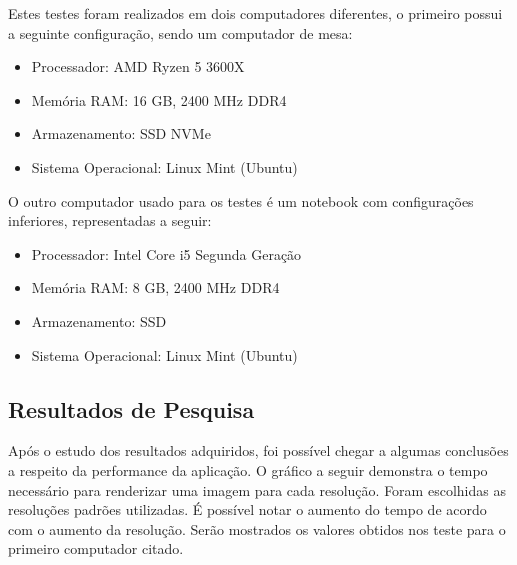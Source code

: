 \documentclass[journal]{IEEEtran}
\begin{document}
Estes testes foram realizados em dois computadores diferentes, o primeiro possui a seguinte configuração, sendo
um computador de mesa:

\begin{itemize}
  \item Processador: AMD Ryzen 5 3600X
  \item Memória RAM: 16 GB, 2400 MHz DDR4
  \item Armazenamento: SSD NVMe
  \item Sistema Operacional: Linux Mint (Ubuntu)
\end{itemize}

O outro computador usado para os testes é um notebook com configurações inferiores, representadas a seguir:

\begin{itemize}
  \item Processador: Intel Core i5 Segunda Geração
  \item Memória RAM: 8 GB, 2400 MHz DDR4
  \item Armazenamento: SSD 
  \item Sistema Operacional: Linux Mint (Ubuntu)
\end{itemize}


\subsection{Resultados de Pesquisa}
Após o estudo dos resultados adquiridos, foi possível chegar a algumas conclusões a respeito
da performance da aplicação. O gráfico a seguir demonstra o tempo necessário para renderizar
uma imagem para cada resolução. Foram escolhidas as resoluções padrões utilizadas. É possível
notar o aumento do tempo de acordo com o aumento da resolução. Serão mostrados os valores obtidos
nos teste para o primeiro computador citado.
\end{document}
